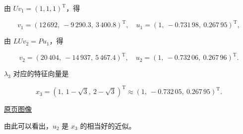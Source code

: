 \documentclass[
  10pt,
  fontset=fandol]{ctexart}
\begin{document}
由 \(Uv_1=(1,1,1)^{\mathrm T}\)，得

\[
v_1=(12\,692,\ -9\,290.3,\ 3\,400.8)^{\mathrm T},\quad
u_1=(1,\ -0.731\,98,\ 0.267\,95)^{\mathrm T},
\]

由 \(LUv_2=Pu_1\)，得

\[
v_2=(20\,404,\ -14\,937,\ 5\,467.4)^{\mathrm T},\quad
u_2=(1,\ -0.732\,06,\ 0.267\,96)^{\mathrm T}.
\]

\(\lambda_3\) 对应的特征向量是

\[
x_3=(1,\ 1-\sqrt3,\ 2-\sqrt3)^{\mathrm T}\approx(1,\ -0.732\,05,\ 0.267\,95)^{\mathrm T}.
\]

\href{../../source-images/pdf-243.jpeg}{原页图像}

由此可以看出，\(u_2\) 是 \(x_3\) 的相当好的近似。
\end{document}
